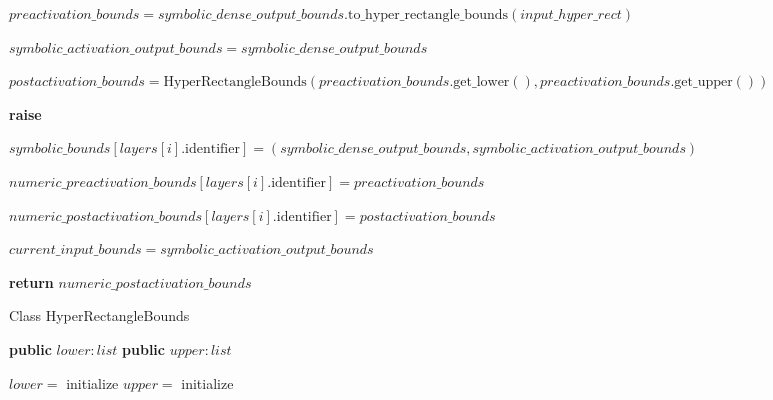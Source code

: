 \begin{algorithm}[t!]
\begin{algorithmic}[1]
            			\State $preactivation\_bounds = symbolic\_dense\_output\_bounds.\text{to\_hyper\_rectangle\_bounds}(input\_hyper\_rect)$
            
            			\State $symbolic\_activation\_output\_bounds = symbolic\_dense\_output\_bounds$
            
            			\State $postactivation\_bounds = \text{HyperRectangleBounds}(preactivation\_bounds.\text{get\_lower}(), preactivation\_bounds.\text{get\_upper}())$
            
        				\Else
            				\State \textbf{raise}             
        			\EndIf
        
        			\State $symbolic\_bounds[layers[i].\text{identifier}] = (symbolic\_dense\_output\_bounds, symbolic\_activation\_output\_bounds)$
        
        			\State $numeric\_preactivation\_bounds[layers[i].\text{identifier}] = preactivation\_bounds$
        
        			\State $numeric\_postactivation\_bounds[layers[i].\text{identifier}] = postactivation\_bounds$
        
        			\State $current\_input\_bounds = symbolic\_activation\_output\_bounds$
        
    		\EndFor
    
    		\State \textbf{return} $numeric\_postactivation\_bounds$
    
	\EndFunction
\end{algorithmic}
\end{algorithm}

\begin{algorithm}
\caption{Class HyperRectangleBounds}
\label{alg:hyper-rect-bound}
\begin{algorithmic}[1]
    \State \textbf{public} $lower: list$
    \State \textbf{public} $upper: list$
\EndProcedure

    \State $lower = $ initialize
    \State $upper = $ initialize
\EndProcedure

\end{algorithmic}
\end{algorithm}




